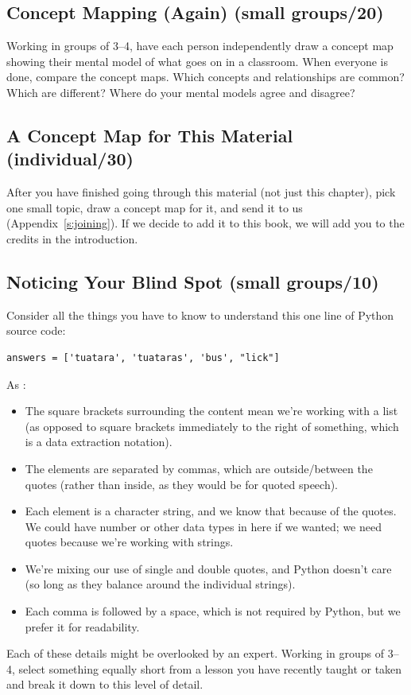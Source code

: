 \subsection*{Concept Mapping (Again) (small groups/20)}

Working in groups of 3--4, have each person independently draw a concept
map showing their mental model of what goes on in a classroom. When
everyone is done, compare the concept maps. Which concepts and
relationships are common? Which are different? Where do your mental
models agree and disagree?

\subsection*{A Concept Map for This Material (individual/30)}

After you have finished going through this material (not just this
chapter), pick one small topic, draw a concept map for it, and send it
to us (Appendix~\ref{s:joining}). If we decide to add it to this book, we
will add you to the credits in the introduction.

\subsection*{Noticing Your Blind Spot (small groups/10)}

Consider all the things you have to know to understand this one line of
Python source code:

\begin{verbatim}
answers = ['tuatara', 'tuataras', 'bus', "lick"]
\end{verbatim}

As :

\begin{itemize}
\item
  The square brackets surrounding the content mean we're working with
  a list (as opposed to square brackets immediately to the right of
  something, which is a data extraction notation).
\item
  The elements are separated by commas, which are outside/between the
  quotes (rather than inside, as they would be for quoted speech).
\item
  Each element is a character string, and we know that because of the
  quotes. We could have number or other data types in here if we
  wanted; we need quotes because we're working with strings.
\item
  We're mixing our use of single and double quotes, and Python doesn't
  care (so long as they balance around the individual strings).
\item
  Each comma is followed by a space, which is not required by Python,
  but we prefer it for readability.
\end{itemize}

Each of these details might be overlooked by an expert. Working in
groups of 3--4, select something equally short from a lesson you have
recently taught or taken and break it down to this level of detail.
